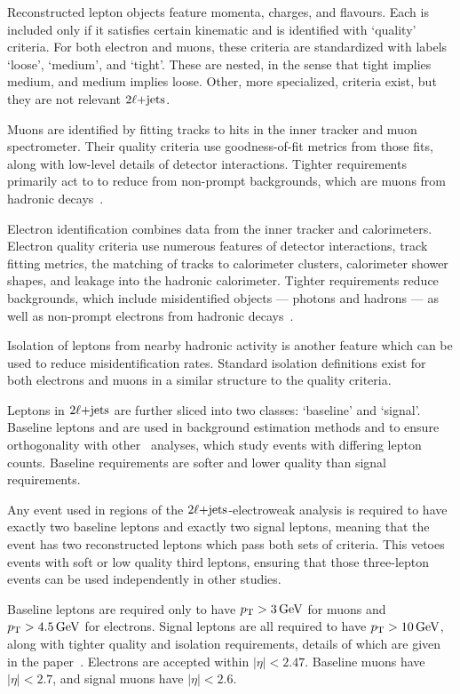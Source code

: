 Reconstructed lepton objects feature momenta, charges, and flavours.
Each is included only if it satisfies certain kinematic and
is identified with `quality' criteria.
For both electron and muons, these criteria are standardized with labels
`loose', `medium', and `tight'.
These are nested, in the sense that tight implies medium,
and medium implies loose.
Other, more specialized, criteria exist, but they are not relevant $\twoljets$.

Muons are identified by fitting tracks to hits in the inner tracker and muon
spectrometer.
Their quality criteria use goodness-of-fit metrics from those fits, along with
low-level details of detector interactions.
Tighter requirements primarily act to to reduce from non-prompt backgrounds,
which are muons from hadronic decays~\cite{atlas_muon_quality_MUON_2018_03}.

Electron identification combines data from the inner tracker and
calorimeters.
Electron quality criteria use numerous features of detector
interactions, track fitting metrics, the matching of tracks to calorimeter
clusters, calorimeter shower shapes, and leakage into the hadronic calorimeter.
Tighter requirements reduce backgrounds, which include misidentified objects
--- photons and hadrons --- as well as non-prompt electrons from hadronic
decays~\cite{atlas_egamma_quality_EGAM_2018_01}.

Isolation of leptons from nearby hadronic activity is another feature which
can be used to reduce misidentification rates.
Standard isolation definitions exist for both electrons and muons in a similar
structure to the quality criteria.

Leptons in $\twoljets$ are further sliced into two classes:
`baseline' and `signal'.
Baseline leptons and are used in background estimation methods and to ensure
orthogonality with other \atlas\ analyses, which study events with differing
lepton counts.
Baseline requirements are softer and lower quality than signal requirements.

Any event used in regions of the $\twoljets$-electroweak analysis is required
to have exactly two baseline leptons and exactly two signal leptons, meaning
that the event has two reconstructed leptons which pass both sets of criteria.
This vetoes events with soft or low quality third leptons, ensuring that those
three-lepton events can be used independently in other studies.

Baseline leptons are required only to have  $\pt > 3\,\eV[G]$ for muons and
$\pt > 4.5\,\eV[G]$ for electrons.
Signal leptons are all required to have $\pt > 10\,\eV[G]$, along with tighter
quality and isolation requirements, details of which are given in the
paper~\cite{atlas2022searches}.
Electrons are accepted within $|\eta| < 2.47$.
Baseline muons have $|\eta| < 2.7$, and signal muons have $|\eta| < 2.6$.


